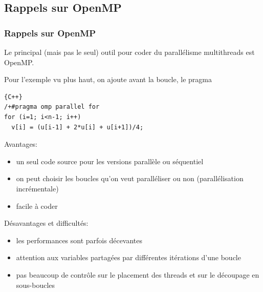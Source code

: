 \documentclass{beamer}
\begin{document}
%
%
%
%
%

\begin{frame}[fragile]
	\section{Rappels sur OpenMP}
	\frametitle{Rappels sur OpenMP}
	\vfill
	Le principal (mais pas le seul) outil pour coder du parallélisme multithreads est OpenMP.

    \vfill
\end{frame}

\begin{frame}[fragile]
	Pour l'exemple vu plus haut, on ajoute avant la boucle, le pragma


\begin{center}
\begin{lstlisting}{C++}
/+#pragma omp parallel for
for (i=1; i<n-1; i++)
  v[i] = (u[i-1] + 2*u[i] + u[i+1])/4;
\end{lstlisting}
\end{center}

\end{frame}

\begin{frame}

Avantages:
\begin{itemize}
	\item un seul code source pour les versions parallèle ou séquentiel
	\item on peut choisir les boucles qu'on veut paralléliser ou non (parallélisation incrémentale)
	\item facile à coder
\end{itemize}
\vfill

Désavantages et difficultés:
\begin{itemize}
	\item les performances sont parfois décevantes
	\item attention aux variables partagées par différentes itérations d'une boucle
	\item pas beaucoup de contrôle sur le placement des threads et sur le découpage en sous-boucles
\end{itemize}

\end{frame}
\end{document}
